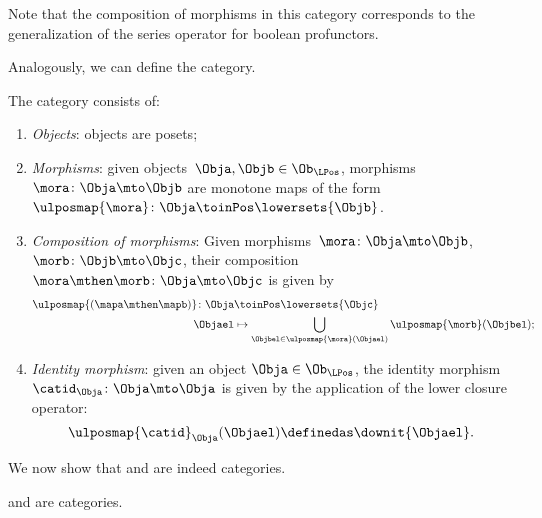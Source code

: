 \begin{remark}
	Note that the composition of morphisms in this category corresponds to the generalization of the series operator for boolean profunctors.
\end{remark}

Analogously, we can define the \LPos category.
\begin{definition}
	\label{def:lpos_cat}
	The category \LPos consists of:
	\begin{enumerate}
		\item \emph{Objects}: objects are posets;
		\item \emph{Morphisms}: given objects~$\Obja,\Objb\in \Ob_{\LPos}$, morphisms~$\mora\colon \Obja\mto \Objb$ are monotone maps of the form~$\ulposmap{\mora} \colon \Obja \toinPos \lowersets{\Objb}$.
		\item \emph{Composition of morphisms}: Given morphisms~$\mora \colon \Obja \mto \Objb$,~$\morb \colon \Objb\mto \Objc$, their composition~$\mora\mthen \morb\colon \Obja\mto \Objc$ is given by
		      \begin{equation}
			      \begin{aligned}
				      \ulposmap{(\mapa \mthen \mapb)} \colon \Obja & \toinPos \lowersets{\Objc}                                                        \\
				      \Objael                                      & \mapsto \bigcup_{\Objbel\in \ulposmap{\mora} (\Objael)}\ulposmap{\morb}(\Objbel);
			      \end{aligned}
		      \end{equation}
		\item \emph{Identity morphism}: given an object $\Obja\in \Ob_{\LPos}$, the identity morphism~$\catid_\Obja \colon \Obja \mto \Obja$ is given by the application of the lower closure operator:
		      \begin{equation}
			      \ulposmap{\catid}_\Obja(\Objael)\definedas \downit\{\Objael\}.
		      \end{equation}
	\end{enumerate}
\end{definition}

We now show that \UPos and \LPos are indeed categories.

\begin{lemma}
	\label{lem:upos_lpos_cats}
	\UPos and \LPos are categories.
\end{lemma}

